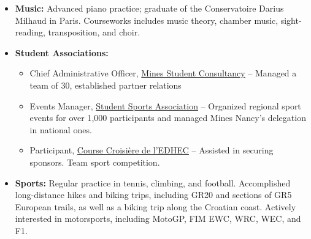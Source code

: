 \documentclass[a4paper,9pt]{extarticle}
\begin{document}
\begin{itemize}
\item \textbf{Music:} Advanced piano practice; graduate of the Conservatoire Darius Milhaud in Paris. Courseworks includes music theory, chamber music, sight-reading, transposition, and choir.
\item \textbf{Student Associations:}
\begin{itemize}
\item Chief Administrative Officer, \href{https://mines-services.fr/}{Mines Student Consultancy} -- Managed a team of 30, established partner relations
\item Events Manager, \href{https://www.bdeminesnancy.com/bds}{Student Sports Association} -- Organized regional sport events for over 1,000 participants and managed Mines Nancy's delegation in national ones.
\item Participant, \href{https://cce.fr/}{Course Croisière de l’EDHEC} -- Assisted in securing sponsors. Team sport competition.
\end{itemize}
\item \textbf{Sports:} Regular practice in tennis, climbing, and football. Accomplished long-distance hikes and biking trips, including GR20 and sections of GR5 European trails, as well as a biking trip along the Croatian coast. Actively interested in motorsports, including MotoGP, FIM EWC, WRC, WEC, and F1.
\end{itemize}
\end{document}
